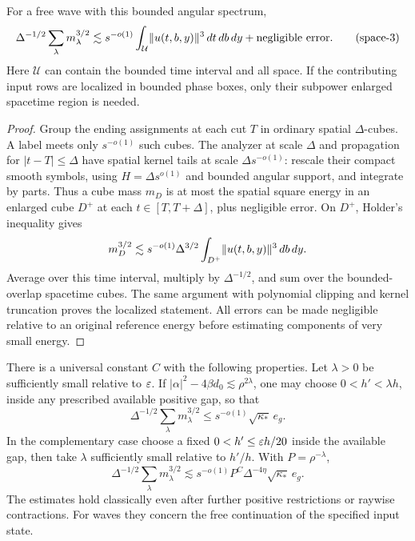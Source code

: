 \begin{lemma}\label{lem:rt-spatial-readout}
For a free wave with this bounded angular spectrum,
\begin{equation}
 \Delta^{-1/2}\sum_\lambda m_\lambda^{3/2}
 \lesssim s^{-o(1)}\int_{\mathcal U}\lVert u(t,b,y)\rVert^3\,dt\,db\,dy
       +\text{negligible error}.
 \tag{space-3}\label{eq:space-3}
\end{equation}
Here $\mathcal U$ can contain the bounded time interval and all space.
If the contributing input rows are localized in bounded phase boxes,
only their subpower enlarged spacetime region is needed.
\end{lemma}

\begin{proof}
Group the ending assignments at each cut $T$ in ordinary spatial
$\Delta$-cubes.  A label meets only $s^{-o(1)}$ such cubes.  The
analyzer at scale $\Delta$ and propagation for $|t-T|\le\Delta$ have
spatial kernel tails at scale $\Delta s^{-o(1)}$: rescale their compact
smooth symbols, using $H=\Delta s^{o(1)}$ and bounded angular
support, and integrate by parts.  Thus a cube mass $m_D$ is at most
the spatial square energy in an enlarged cube $D^+$ at each
$t\in[T,T+\Delta]$, plus negligible error.  On $D^+$, Holder's
inequality gives
\[
 m_D^{3/2}
 \lesssim s^{-o(1)}\Delta^{3/2}
               \int_{D^+}\lVert u(t,b,y)\rVert^3\,db\,dy.
\]
Average over this time interval, multiply by $\Delta^{-1/2}$, and
sum over the bounded-overlap spacetime cubes.  The same argument with
polynomial clipping and kernel truncation proves the localized
statement.  All errors can be made negligible relative to an original
reference energy before estimating components of very small energy.
\end{proof}

\begin{proposition}\label{prop:rt-plane}
There is a universal constant $C$ with the following properties.
Let $\lambda>0$ be sufficiently small relative to $\varepsilon$.
If
$|\alpha|^2-4\beta d_0\lesssim\rho^{2\lambda}$, one may choose
$0<h'<\lambda h$, inside any prescribed available positive gap, so
that
\begin{equation}
 \Delta^{-1/2}\sum_\lambda m_\lambda^{3/2}
 \le s^{-o(1)}\sqrt{\kappa_*}\,e_g.
 \tag{tiny-cap}\label{eq:tiny-cap}
\end{equation}
In the complementary case choose a fixed
$0<h'\le\varepsilon h/20$ inside the available gap, then take
$\lambda$ sufficiently small relative to $h'/h$.  With
$P=\rho^{-\lambda}$,
\begin{equation}
 \Delta^{-1/2}\sum_\lambda m_\lambda^{3/2}
 \lesssim s^{-o(1)}P^C\Delta^{-4\eta}
                    \sqrt{\kappa_*}\,e_g.
 \tag{sec}\label{eq:sec}
\end{equation}
The estimates hold classically even after further positive
restrictions or raywise contractions.  For waves they concern the free
continuation of the specified input state.
\end{proposition}

